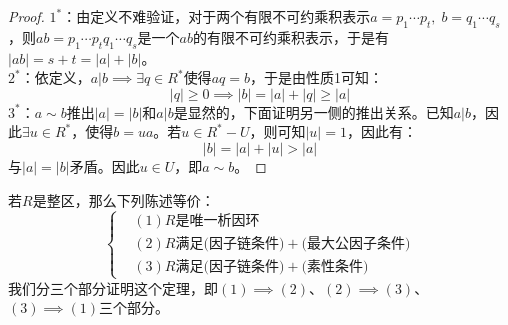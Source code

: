 \begin{proof}
$1^*$：由定义不难验证，对于两个有限不可约乘积表示$a=p_1\cdots p_t,\; b=q_1\cdots q_s$，则$ab=p_1\cdots p_tq_1\cdots q_s$是一个$ab$的有限不可约乘积表示，于是有$|ab|=s+t=|a|+|b|$。\\
\indent $2^*$：依定义，$a|b\implies \exists q\in R^*$使得$aq=b$，于是由性质1可知：
\[
|q|\geq 0\implies|b|=|a|+|q|\geq|a|
\]
\indent $3^*$：$a\sim b$推出$|a|=|b|$和$a|b$是显然的，下面证明另一侧的推出关系。已知$a|b$，因此$\exists u\in R^*$，使得$b=ua$。若$u\in R^*-U$，则可知$|u|=1$，因此有：
\[
|b|=|a|+|u|>|a|
\]
与$|a|=|b|$矛盾。因此$u\in U$，即$a\sim b$。
\end{proof}
若$R$是整区，那么下列陈述等价：
\[
\left\{
\begin{aligned}
&(1)R\text{是唯一析因环}\\
&(2)R\text{满足(因子链条件)}+\text{(最大公因子条件)}\\
&(3)R\text{满足(因子链条件)}+\text{(素性条件)}
\end{aligned}\right.
\]
我们分三个部分证明这个定理，即$(1)\implies(2)$、$(2)\implies(3)$、$(3)\implies(1)$三个部分。\\

